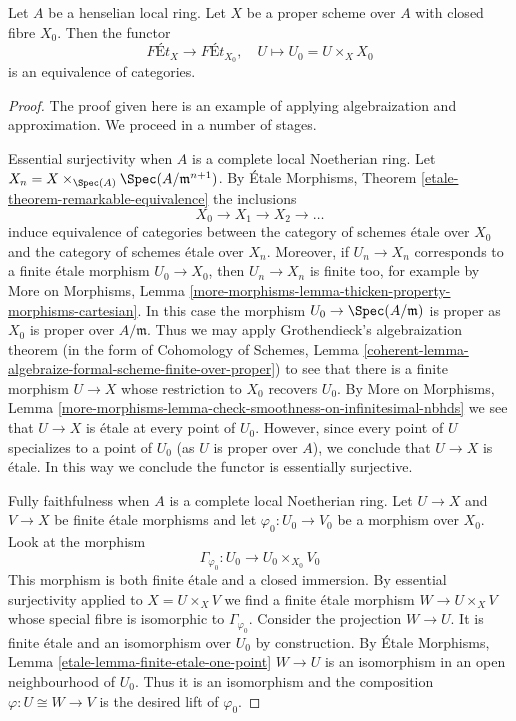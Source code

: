 %
\begin{lemma}
\label{lemma-finite-etale-on-proper-over-henselian}
Let $A$ be a henselian local ring. Let $X$ be a proper scheme over $A$
with closed fibre $X_0$. Then the functor
$$
\textit{F\'Et}_X \to \textit{F\'Et}_{X_0},\quad
U \longmapsto U_0 = U \times_X X_0
$$
is an equivalence of categories.
\end{lemma}

\begin{proof}
The proof given here is an example of applying algebraization and
approximation. We proceed in a number of stages.

\medskip\noindent
Essential surjectivity when $A$ is a complete local Noetherian ring.
Let $X_n = X \times_{\Spec(A)} \Spec(A/\mathfrak m^{n + 1})$.
By \'Etale Morphisms, Theorem \ref{etale-theorem-remarkable-equivalence}
the inclusions
$$
X_0 \to X_1 \to X_2 \to \ldots
$$
induce equivalence of categories between the category
of schemes \'etale over $X_0$ and the category of schemes
\'etale over $X_n$.
Moreover, if $U_n \to X_n$ corresponds to a finite \'etale
morphism $U_0 \to X_0$, then $U_n \to X_n$ is finite too, for example
by More on Morphisms, Lemma
\ref{more-morphisms-lemma-thicken-property-morphisms-cartesian}.
In this case the morphism $U_0 \to \Spec(A/\mathfrak m)$
is proper as $X_0$ is proper over $A/\mathfrak m$. Thus we may apply
Grothendieck's algebraization theorem
(in the form of
Cohomology of Schemes, Lemma
\ref{coherent-lemma-algebraize-formal-scheme-finite-over-proper})
to see that there is a finite morphism $U \to X$ whose restriction
to $X_0$ recovers $U_0$. By More on Morphisms, Lemma
\ref{more-morphisms-lemma-check-smoothness-on-infinitesimal-nbhds}
we see that $U \to X$ is \'etale at every point of $U_0$.
However, since every point of $U$ specializes to a point of $U_0$
(as $U$ is proper over $A$), we conclude that $U \to X$ is \'etale.
In this way we conclude the functor is essentially surjective.

\medskip\noindent
Fully faithfulness when $A$ is a complete local Noetherian ring.
Let $U \to X$ and $V \to X$ be finite \'etale morphisms and
let $\varphi_0 : U_0 \to V_0$ be a morphism over $X_0$. Look at
the morphism
$$
\Gamma_{\varphi_0} : U_0 \longrightarrow U_0 \times_{X_0} V_0
$$
This morphism is both finite \'etale and a closed immersion.
By essential surjectivity applied to $X = U \times_X V$ we find
a finite \'etale morphism $W \to U \times_X V$ whose special
fibre is isomorphic to $\Gamma_{\varphi_0}$. Consider the projection
$W \to U$. It is finite \'etale and an isomorphism over $U_0$ by
construction. By \'Etale Morphisms, Lemma
\ref{etale-lemma-finite-etale-one-point}
$W \to U$ is an isomorphism in an open neighbourhood of $U_0$.
Thus it is an isomorphism and the composition $\varphi : U \cong W \to V$
is the desired lift of $\varphi_0$.


\end{proof}
